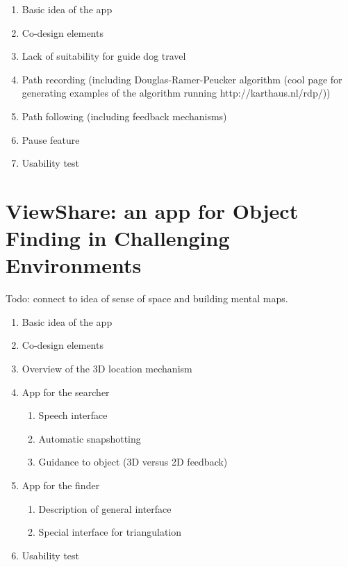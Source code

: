 \documentclass[chi_draft]{sigchi}
\begin{document}
\begin{enumerate}
\item Basic idea of the app
\item Co-design elements
\item Lack of suitability for guide dog travel
\item Path recording (including Douglas-Ramer-Peucker algorithm \cite{douglas1973algorithms} (cool page for generating examples of the algorithm running http://karthaus.nl/rdp/))
\item Path following (including feedback mechanisms)
\item Pause feature
\item Usability test
\end{enumerate}

\section{ViewShare: an app for Object Finding in Challenging Environments}
Todo: connect to idea of sense of space and building mental maps.
\begin{enumerate}
\item Basic idea  of the app
\item Co-design elements
\item Overview of the 3D location mechanism
\item App for the searcher
\begin{enumerate}
\item Speech interface
\item Automatic snapshotting
\item Guidance to object (3D versus 2D feedback)
\end{enumerate}
\item App for the finder
\begin{enumerate}
\item Description of general interface
\item Special interface for triangulation
\end{enumerate}
\item Usability test
\end{enumerate}
\end{document}
